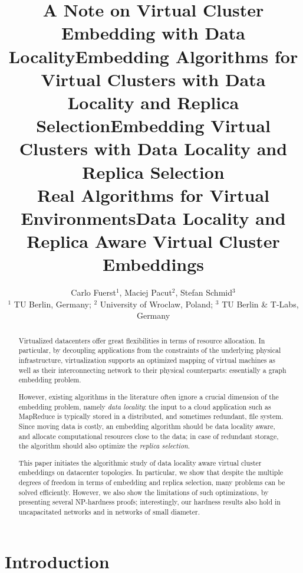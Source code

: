 \documentclass[9pt]{sigcomm-alternate}
\title{A Note on Virtual Cluster Embedding with Data Locality}
\title{Embedding Algorithms for Virtual Clusters with Data Locality and Replica Selection}
\title{Embedding Virtual Clusters with Data Locality and Replica Selection\\{\Large Real Algorithms for Virtual Environments}}
\title{Data Locality and Replica Aware Virtual Cluster Embeddings}
\author{Carlo Fuerst$^1$, Maciej Pacut$^2$, Stefan Schmid$^3$\\
{\small $^1$ TU Berlin, Germany; $^2$ University of Wroclaw, Poland; $^3$ TU Berlin \& T-Labs, Germany}}
\begin{document}
\maketitle


\begin{abstract}
Virtualized datacenters offer great flexibilities in terms of resource allocation. In particular, by
decoupling applications from the constraints of the underlying physical infrastructure, virtualization
supports an optimized mapping of virtual machines as well as their interconnecting network
to their
physical counterparts: essentially a graph embedding problem.

However, existing algorithms
in the literature often ignore a crucial dimension of the embedding problem, namely \emph{data locality}:
the input to a cloud application such as MapReduce is typically stored in a distributed,
and sometimes redundant, file system. Since moving
data is costly, an embedding algorithm should be data locality aware,
and allocate computational resources close to the data; in case of redundant storage, the algorithm should also optimize the \emph{replica selection}.

This paper initiates the algorithmic study of data locality aware virtual cluster embeddings
on datacenter topologies.
In particular, we
show that
despite the multiple degrees of freedom in terms of embedding and replica selection,
many problems can be
solved efficiently. However, we also show the limitations of such optimizations,
by presenting several NP-hardness proofs; interestingly,
our hardness results also hold in uncapacitated networks and in networks of small diameter.
\end{abstract}

%

\section{Introduction}
\end{document}

